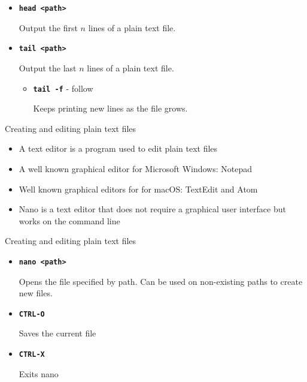 \documentclass[aspectratio=1610]{beamer}
\newcommand\curtitle{}
\newcommand\command[1]{\alert{\textbf{\texttt{#1}}}}
\begin{document}
\begin{frame}[c]{\curtitle}
    \begin{itemize}[<+->]
        \setlength\itemsep{1em}
        \item \command{head <path>}

            Output the first $n$ lines of a plain text file.
        \item \command{tail <path>}

            Output the last $n$ lines of a plain text file.
            \begin{itemize}[<.->]
                \item \command{tail -f} - follow

                    Keeps printing new lines as the file grows.
            \end{itemize}

    \end{itemize}
\end{frame}


\renewcommand\curtitle{Creating and editing plain text files}

\begin{frame}[c]{\curtitle}
    \begin{itemize}[<+->]
        \setlength\itemsep{1em}
        \item A \alert{text editor} is a program used to edit plain text files
        \item A well known graphical editor for Microsoft Windows: \alert{Notepad}
        \item Well known graphical editors for for macOS: \alert{TextEdit} and \alert{Atom}
        \item \alert{Nano} is a text editor that does not require a graphical user interface but works on the command line
    \end{itemize}
\end{frame}


\begin{frame}[c]{\curtitle}
    \begin{itemize}[<+->]
        \setlength\itemsep{1em}
    \item \command{nano <path>}

        Opens the file specified by path. Can be used on non-existing paths to create
        new files.
    \item \command{CTRL-O}

        Saves the current file
    \item \command{CTRL-X}

        Exits nano
\end{itemize}
\end{frame}
\end{document}
